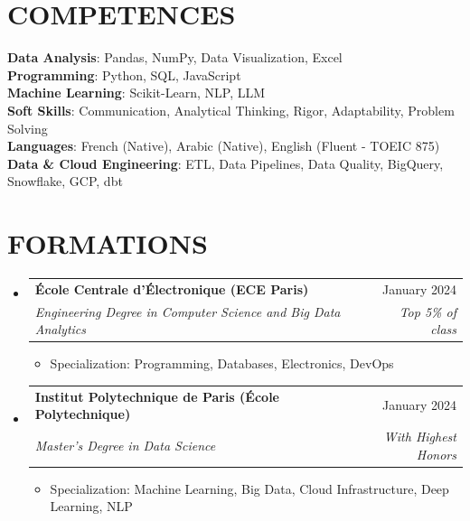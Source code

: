 \documentclass[11pt,a4paper]{article}
\makeatletter
\newcommand{\resumeItem}[1]{
  \item\footnotesize{
    {#1 \vspace{-1pt}}
  }
}
\newcommand{\resumeSubheading}[4]{
  \vspace{2pt}\item
    \begin{tabular*}{\textwidth}[t]{l@{\extracolsep{\fill}}r}
      {\footnotesize\textbf{#1}} & {\footnotesize#2} \\
      {\footnotesize\textit{#3}} & {\footnotesize\textit{#4}} \\
    \end{tabular*}\vspace{2pt}
}
\newcommand{\resumeSubHeadingListStart}{\begin{itemize}[leftmargin=0in, label={}]}
\newcommand{\resumeSubHeadingListEnd}{\end{itemize}}
\newcommand{\resumeItemListStart}{\begin{itemize}[label={\textbullet}]}
\newcommand{\resumeItemListEnd}{\end{itemize}\vspace{0pt}}
\makeatother
\begin{document}
\section{COMPETENCES}
\begin{itemize}[leftmargin=0in, label={}]
\footnotesize{\item{
{\footnotesize\textbf{Data Analysis}:} {\footnotesize Pandas, NumPy, Data Visualization, Excel} \\
\vspace{3pt}
{\footnotesize\textbf{Programming}:} {\footnotesize Python, SQL, JavaScript} \\
\vspace{3pt}
{\footnotesize\textbf{Machine Learning}:} {\footnotesize Scikit-Learn, NLP, LLM} \\
\vspace{3pt}
{\footnotesize\textbf{Soft Skills}:} {\footnotesize Communication, Analytical Thinking, Rigor, Adaptability, Problem Solving} \\
\vspace{3pt}
{\footnotesize\textbf{Languages}:} {\footnotesize French (Native), Arabic (Native), English (Fluent - TOEIC 875)} \\
\vspace{3pt}
{\footnotesize\textbf{Data \& Cloud Engineering}:} {\footnotesize ETL, Data Pipelines, Data Quality, BigQuery, Snowflake, GCP, dbt}
}
}
\end{itemize}

\section{FORMATIONS}
\resumeSubHeadingListStart
    \resumeSubheading
      {École Centrale d'Électronique (ECE Paris)}
      {January 2024}
      {Engineering Degree in Computer Science and Big Data Analytics}
      {Top 5\% of class}
      \resumeItemListStart
        \resumeItem{Specialization: Programming, Databases, Electronics, DevOps}
      \resumeItemListEnd
    \resumeSubheading
      {Institut Polytechnique de Paris (École Polytechnique)}
      {January 2024}
      {Master's Degree in Data Science}
      {With Highest Honors}
      \resumeItemListStart
        \resumeItem{Specialization: Machine Learning, Big Data, Cloud Infrastructure, Deep Learning, NLP}
      \resumeItemListEnd
  \resumeSubHeadingListEnd
\end{document}
